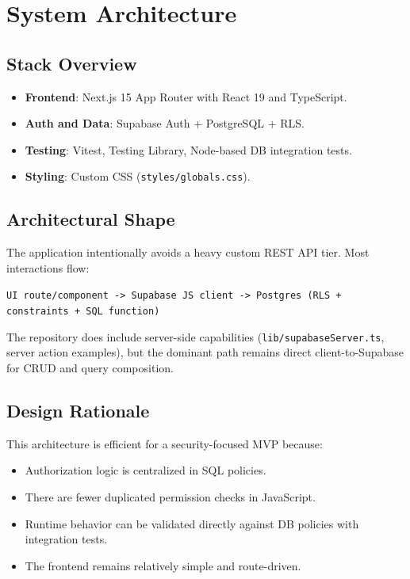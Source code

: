 \documentclass[11pt]{article}
\begin{document}
\section{System Architecture}
\subsection{Stack Overview}
\begin{itemize}[leftmargin=*]
  \item \textbf{Frontend}: Next.js 15 App Router with React 19 and TypeScript.
  \item \textbf{Auth and Data}: Supabase Auth + PostgreSQL + RLS.
  \item \textbf{Testing}: Vitest, Testing Library, Node-based DB integration tests.
  \item \textbf{Styling}: Custom CSS (\texttt{styles/globals.css}).
\end{itemize}

\subsection{Architectural Shape}
The application intentionally avoids a heavy custom REST API tier. Most interactions flow:
\begin{center}
\texttt{UI route/component -> Supabase JS client -> Postgres (RLS + constraints + SQL function)}
\end{center}

The repository does include server-side capabilities (\texttt{lib/supabaseServer.ts}, server action examples), but the dominant path remains direct client-to-Supabase for CRUD and query composition.

\subsection{Design Rationale}
This architecture is efficient for a security-focused MVP because:
\begin{itemize}[leftmargin=*]
  \item Authorization logic is centralized in SQL policies.
  \item There are fewer duplicated permission checks in JavaScript.
  \item Runtime behavior can be validated directly against DB policies with integration tests.
  \item The frontend remains relatively simple and route-driven.
\end{itemize}
\end{document}
